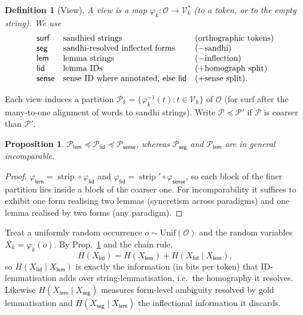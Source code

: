 \documentclass[11pt,a4paper]{article}
\newtheorem{definition}{Definition}
\newtheorem{proposition}{Proposition}
\theoremstyle{remark}\newtheorem{remark}{Remark}
\newcommand{\Occ}{\mathcal{O}}          %
\newcommand{\View}{\varphi}             %
\newcommand{\Part}{\mathcal{P}}         %
\newcommand{\Voc}{\mathcal{V}}          %
\newcommand{\strip}{\operatorname{strip}}
\newcommand{\vk}[1]{\textsf{#1}}         %
\begin{document}
\begin{definition}[View]
A \emph{view} is a map $\View_k:\Occ\to\Voc_k^*$ (to a token, or to the
empty string). We use
\[
\begin{array}{lll}
\vk{surf} & \text{sandhied strings} & \text{(orthographic tokens)}\\
\vk{seg} & \text{sandhi-resolved inflected forms} & (-\text{sandhi})\\
\vk{lem} & \text{lemma strings} & (-\text{inflection})\\
\vk{lid} & \text{lemma IDs} & (+\text{homograph split})\\
\vk{sense} & \text{sense ID where annotated, else \vk{lid}} & (+\text{sense split}).
\end{array}
\]
\end{definition}
\noindent Each view induces a partition $\Part_k = \{\View_k^{-1}(t) : t\in
\Voc_k\}$ of $\Occ$ (for \vk{surf} after the many-to-one alignment of words to
sandhi strings). Write $\Part\preceq\Part'$ if $\Part$ is coarser than $\Part'$.

\begin{proposition}\label{prop:chain}
$\Part_{\vk{lem}}\preceq\Part_{\vk{lid}}\preceq\Part_{\vk{sense}}$, whereas
$\Part_{\vk{seg}}$ and $\Part_{\vk{lem}}$ are in general incomparable.
\end{proposition}
\begin{proof}
$\View_{\vk{lem}}=\strip\circ\View_{\vk{lid}}$ and
$\View_{\vk{lid}}=\strip'\circ\View_{\vk{sense}}$, so each block of the finer
partition lies inside a block of the coarser one. For incomparability it
suffices to exhibit one form realising two lemmas (syncretism across
paradigms) and one lemma realised by two forms (any paradigm).
\end{proof}

Treat a uniformly random occurrence $o\sim\mathrm{Unif}(\Occ)$ and the random
variables $X_k = \View_k(o)$. By Prop.~\ref{prop:chain} and the chain rule,
\begin{equation}\label{eq:chain}
H(X_{\vk{lid}}) = H(X_{\vk{lem}}) + H(X_{\vk{lid}}\mid X_{\vk{lem}}),
\end{equation}
so $H(X_{\vk{lid}}\mid X_{\vk{lem}})$ is exactly the information (in bits per
token) that ID-lemmatisation adds over string-lemmatisation, i.e.\ the
homography it resolves. Likewise $H(X_{\vk{lem}}\mid X_{\vk{seg}})$ measures
form-level ambiguity resolved by gold lemmatisation and
$H(X_{\vk{seg}}\mid X_{\vk{lem}})$ the inflectional information it discards.
\end{document}
